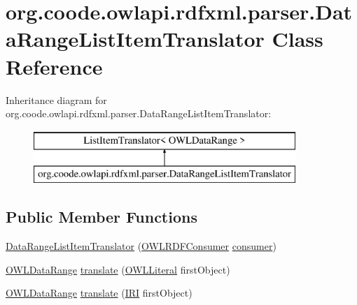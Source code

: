 \hypertarget{classorg_1_1coode_1_1owlapi_1_1rdfxml_1_1parser_1_1_data_range_list_item_translator}{\section{org.\-coode.\-owlapi.\-rdfxml.\-parser.\-Data\-Range\-List\-Item\-Translator Class Reference}
\label{classorg_1_1coode_1_1owlapi_1_1rdfxml_1_1parser_1_1_data_range_list_item_translator}
}
Inheritance diagram for org.\-coode.\-owlapi.\-rdfxml.\-parser.\-Data\-Range\-List\-Item\-Translator\-:\begin{figure}[H]
\begin{center}
\leavevmode
\includegraphics[height=2.000000cm]{classorg_1_1coode_1_1owlapi_1_1rdfxml_1_1parser_1_1_data_range_list_item_translator}
\end{center}
\end{figure}
\subsection*{Public Member Functions}
\begin{DoxyCompactItemize}
\item 
\hyperlink{classorg_1_1coode_1_1owlapi_1_1rdfxml_1_1parser_1_1_data_range_list_item_translator_aa72a6fa987f5d090509dbf165617b141}{Data\-Range\-List\-Item\-Translator} (\hyperlink{classorg_1_1coode_1_1owlapi_1_1rdfxml_1_1parser_1_1_o_w_l_r_d_f_consumer}{O\-W\-L\-R\-D\-F\-Consumer} \hyperlink{classorg_1_1coode_1_1owlapi_1_1rdfxml_1_1parser_1_1_data_range_list_item_translator_af397e35a7adc51a35b854349a0a2d61a}{consumer})
\item 
\hyperlink{interfaceorg_1_1semanticweb_1_1owlapi_1_1model_1_1_o_w_l_data_range}{O\-W\-L\-Data\-Range} \hyperlink{classorg_1_1coode_1_1owlapi_1_1rdfxml_1_1parser_1_1_data_range_list_item_translator_a2b3e022503247d983999ca314db5c669}{translate} (\hyperlink{interfaceorg_1_1semanticweb_1_1owlapi_1_1model_1_1_o_w_l_literal}{O\-W\-L\-Literal} first\-Object)
\item 
\hyperlink{interfaceorg_1_1semanticweb_1_1owlapi_1_1model_1_1_o_w_l_data_range}{O\-W\-L\-Data\-Range} \hyperlink{classorg_1_1coode_1_1owlapi_1_1rdfxml_1_1parser_1_1_data_range_list_item_translator_a05cb854b3630bad126b298a11106aaf9}{translate} (\hyperlink{classorg_1_1semanticweb_1_1owlapi_1_1model_1_1_i_r_i}{I\-R\-I} first\-Object)
\end{DoxyCompactItemize}
